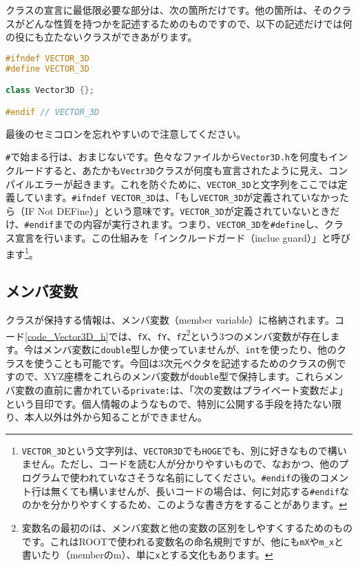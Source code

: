 クラスの宣言に最低限必要な部分は、次の箇所だけです。他の箇所は、そのクラスがどんな性質を持つかを記述するためのものですので、以下の記述だけでは何の役にも立たないクラスができあがります。
\begin{lstlisting}[language=c++]
#ifndef VECTOR_3D
#define VECTOR_3D

class Vector3D {};

#endif // VECTOR_3D
\end{lstlisting}
最後のセミコロンを忘れやすいので注意してください。

\texttt{\#}で始まる行は、おまじないです。色々なファイルから\texttt{Vector3D.h}を何度もインクルードすると、あたかも\texttt{Vectr3D}クラスが何度も宣言されたように見え、コンパイルエラーが起きます。これを防ぐために、\texttt{VECTOR\_3D}と文字列をここでは定義しています。\texttt{\#ifndef VECTOR\_3D}は、「もし\texttt{VECTOR\_3D}が定義されていなかったら（IF Not DEFine）」という意味です。\texttt{VECTOR\_3D}が定義されていないときだけ、\texttt{\#endif}までの内容が実行されます。つまり、\texttt{VECTOR\_3D}を\texttt{\#define}し、クラス宣言を行います。この仕組みを「インクルードガード（inclue guard）」と呼びます\footnote{\texttt{VECTOR\_3D}という文字列は、\texttt{VECTOR3D}でも\texttt{HOGE}でも、別に好きなもので構いません。ただし、コードを読む人が分かりやすいもので、なおかつ、他のプログラムで使われていなさそうな名前にしてください。\texttt{\#endif}の後のコメント行は無くても構いませんが、長いコードの場合は、何に対応する\texttt{\#endif}なのかを分かりやすくするため、このような書き方をすることがあります。}。

\subsection{メンバ変数}
\label{subsec:メンバ変数}
クラスが保持する情報は、メンバ変数（member variable）に格納されます。コード\ref{code_Vector3D_h}では、\texttt{fX}、\texttt{fY}、\texttt{fZ}\footnote{変数名の最初のfは、メンバ変数と他の変数の区別をしやすくするためのものです。これはROOTで使われる変数名の命名規則ですが、他にも\texttt{mX}や\texttt{m\_x}と書いたり（memberのm）、単に\texttt{x}とする文化もあります。}という3つのメンバ変数が存在します。今はメンバ変数に\texttt{double}型しか使っていませんが、\texttt{int}を使ったり、他のクラスを使うことも可能です。今回は3次元ベクタを記述するためのクラスの例ですので、XYZ座標をこれらのメンバ変数が\texttt{double}型で保持します。これらメンバ変数の直前に書かれている\texttt{private:}は、「次の変数はプライベート変数だよ」という目印です。個人情報のようなもので、特別に公開する手段を持たない限り、本人以外は外から知ることができません。


